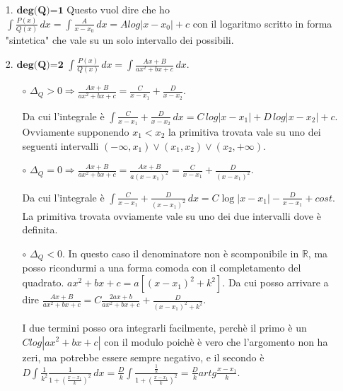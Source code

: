 \documentclass{article}
\theoremstyle{definition}
\theoremstyle{definition}
\theoremstyle{definition}
\theoremstyle{definition}
\theoremstyle{definition}
\theoremstyle{definition}
\begin{document}
\begin{itemize}
    \item [1.] $\textbf{deg(Q)=1}$
                \newline
                Questo vuol dire che ho $\displaystyle{\int\frac{P(x)}{Q(x)}\,dx=\int\frac{A}{x-x_0}\,dx=Alog\left|x-x_0\right|+c}$ con il logaritmo scritto in forma "sintetica" che vale su un solo intervallo dei possibili.
    \item [2.] $\textbf{deg(Q)=2}$
                \newline
                \newline
                $\displaystyle{\int\frac{P(x)}{Q(x)}\,dx=\int\frac{Ax+B}{ax^2+bx+c}\,dx}$.
                \begin{itemize}
                    \item [$\circ$] $\displaystyle{\Delta_Q>0 \Rightarrow \frac{Ax+B}{ax^2+bx+c}=\frac{C}{x-x_1}+\frac{D}{x-x_2}}$. 
                    
                    Da cui l'integrale è $\displaystyle{\int\frac{C}{x-x_1}+\frac{D}{x-x_2}\,dx=C\,log\left|x-x_1\right|+D\,log\left|x-x_2\right|+c}$.
                    Ovviamente supponendo $x_1<x_2$ la primitiva trovata vale su uno dei seguenti intervalli $(-\infty,x_1)\vee(x_1,x_2)\vee(x_2,+\infty)$.

                    \item [$\circ$] $\displaystyle{\Delta_Q=0} \Rightarrow \frac{Ax+B}{ax^2+bx+c}=\frac{Ax+B}{a(x-x_1)^2}=\frac{C}{x-x_1}+\frac{D}{(x-x_1)^2}$.
                    
                    Da cui l'integrale è $\displaystyle{\int\frac{C}{x-x_1}+\frac{D}{(x-x_1)^2}\,dx}=C\log\left|x-x_1\right|-\frac{D}{x-x_1} +cost$.
                    La primitiva trovata ovviamente vale su uno dei due intervalli dove è definita.

                    \item [$\circ$] $\displaystyle{\Delta_Q<0}$. In questo caso il denominatore non è scomponibile in $\mathbb{R}$, ma posso ricondurmi a una forma comoda con il completamento del quadrato. 
                    $\displaystyle{ax^2+bx+c=a[(x-x_1)^2+k^2]}$. Da cui posso arrivare a dire $\displaystyle{\frac{Ax+B}{ax^2+bx+c}=C\frac{2ax+b}{ax^2+bx+c}+\frac{D}{(x-x_1)^2+k^2}}$.

                    I due termini posso ora integrarli facilmente, perchè il primo è un $Clog\left|ax^2+bx+c\right|$ con il modulo poichè è vero che l'argomento non ha zeri, ma potrebbe essere sempre negativo, e il secondo è $\displaystyle{D\int\frac{1}{k^2}\frac{1}{1+(\frac{x-x_1}{k})^2}\,dx=\frac{D}{k}\int\frac{\frac{1}{k}}{1+(\frac{x-x_1}{k})^2}=\frac{D}{k}artg\frac{x-x_1}{k}}$.


\end{itemize}
\end{itemize}
\end{document}
